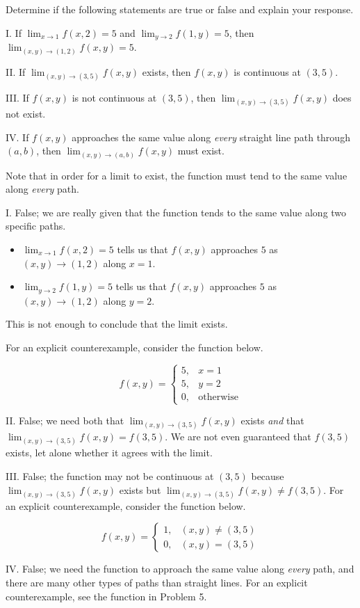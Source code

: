\documentclass[noauthor, handout]{ximera}
\newcommand{\Lim}[2]{\lim_{#1 \to #2}}
\begin{document}
\begin{problem}
Determine if the following statements are true or false and explain your response.

I. If $\Lim{x}{1} f(x,2) = 5$ and $\Lim{y}{2} f(1,y)=5$, then $\Lim{(x,y)}{(1,2)} f(x,y) =5$.

II. If $\Lim{(x,y)}{(3,5)} f(x,y)$ exists, then $f(x,y)$ is continuous at $(3,5)$.

III. If  $f(x,y)$ is not continuous at $(3,5)$, then $\Lim{(x,y)}{(3,5)} f(x,y)$ does not exist.

IV. If $f(x,y)$ approaches the same value along \emph{every} straight line path through $(a,b)$, then $\Lim{(x,y)}{(a,b)} f(x,y)$ must exist.


\begin{freeResponse} Note that in order for a limit to exist, the function must tend to the same value along \emph{every} path.

I. False; we are really given that the function tends to the same value along two specific paths.

\begin{itemize}
\item $\Lim{x}{1} f(x,2) = 5$ tells us that $f(x,y)$ approaches $5$ as $(x,y) \to (1,2)$ along $x=1$.
\item $\Lim{y}{2} f(1,y) = 5$ tells us that $f(x,y)$ approaches $5$ as $(x,y) \to (1,2)$ along $y=2$.
\end{itemize}

This is not enough to conclude that the limit exists.

For an explicit counterexample, consider the function below.

\[
f(x,y) = \begin{cases}5, & x=1 \\ 5, & y=2 \\ 0, & \textrm{otherwise}\end{cases}
\]

II. False; we need both that $\Lim{(x,y)}{(3,5)} f(x,y)$ exists \emph{and} that $\Lim{(x,y)}{(3,5)} f(x,y) = f(3,5)$.  We are not even guaranteed that $f(3,5)$ exists, let alone whether it agrees with the limit.

III. False; the function may not be continuous at $(3,5)$ because $\Lim{(x,y)}{(3,5)} f(x,y)$ exists but $\Lim{(x,y)}{(3,5)} f(x,y) \neq f(3,5)$.  For an explicit counterexample, consider the function below.

\[
f(x,y) = \begin{cases} 1, & (x,y) \neq (3,5) \\ 0, & (x,y) =(3,5)\end{cases}
\]

IV. False; we need the function to approach the same value along \emph{every} path, and there are many other types of paths than straight lines.  For an explicit counterexample, see the function in Problem 5.
\end{freeResponse}
\end{problem}
\end{document}
